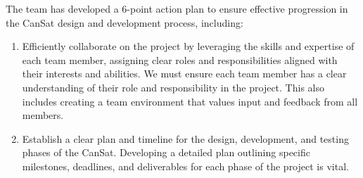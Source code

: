 The team has developed a 6-point action plan to ensure effective progression in the CanSat design and development process, including:
\begin{enumerate}[topsep=3pt]
    \item Efficiently collaborate on the project by leveraging the skills and expertise of each team member, assigning clear roles and responsibilities aligned with their interests and abilities. We must ensure each team member has a clear understanding of their role and responsibility in the project. This also includes creating a team environment that values input and feedback from all members.

    \item Establish a clear plan and timeline for the design, development, and testing phases of the CanSat. Developing a detailed plan outlining specific milestones, deadlines, and deliverables for each phase of the project is vital.


\end{enumerate}
